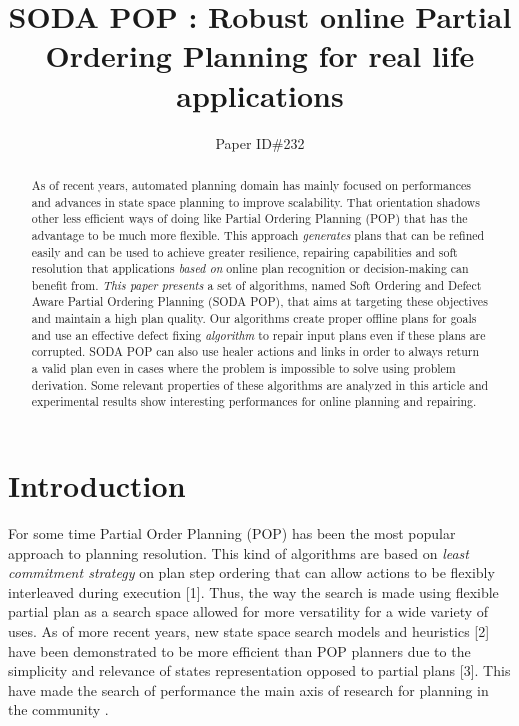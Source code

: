 \documentclass[]{article}
\title{SODA POP : Robust online Partial Ordering Planning for real life
applications}
\author{Paper ID\#232}
\date{}
\begin{document}
\maketitle
\begin{abstract}
As of recent years, automated planning domain has mainly focused on
performances and advances in state space planning to improve
scalability. That orientation shadows other less efficient ways of doing
like Partial Ordering Planning (POP) that has the advantage to be much
more flexible. This approach \emph{generates} plans that can be refined
easily and can be used to achieve greater resilience, repairing
capabilities and soft resolution that applications \emph{based on}
online plan recognition or decision-making can benefit from. \emph{This
paper presents} a set of algorithms, named Soft Ordering and Defect
Aware Partial Ordering Planning (SODA POP), that aims at targeting these
objectives and maintain a high plan quality. Our algorithms create
proper offline plans for goals and use an effective defect fixing
\emph{algorithm} to repair input plans even if these plans are
corrupted. SODA POP can also use healer actions and links in order to
always return a valid plan even in cases where the problem is impossible
to solve using problem derivation. Some relevant properties of these
algorithms are analyzed in this article and experimental results show
interesting performances for online planning and repairing.
\end{abstract}

\section*{Introduction}\label{introduction}

For some time Partial Order Planning (POP) has been the most popular
approach to planning resolution. This kind of algorithms are based on
\emph{least commitment strategy} on plan step ordering that can allow
actions to be flexibly interleaved during execution {[}1{]}. Thus, the
way the search is made using flexible partial plan as a search space
allowed for more versatility for a wide variety of uses. As of more
recent years, new state space search models and heuristics {[}2{]} have
been demonstrated to be more efficient than POP planners due to the
simplicity and relevance of states representation opposed to partial
plans {[}3{]}. This have made the search of performance the main axis of
research for planning in the community .
\end{document}
